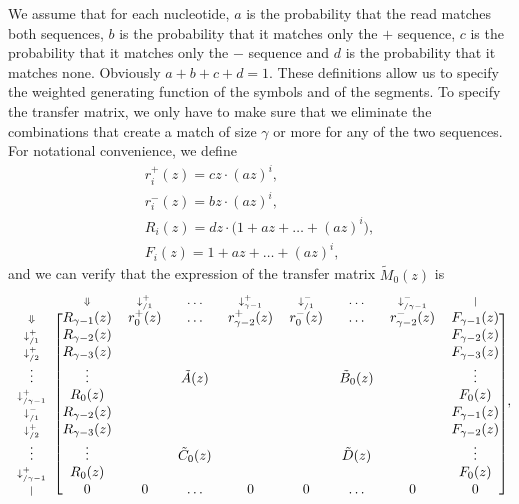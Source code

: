 \documentclass{article}
\begin{document}
We assume that for each nucleotide, $a$ is the probability that the read
matches both sequences, $b$ is the probability that it matches only the
$+$ sequence, $c$ is the probability that it matches only the $-$ sequence
and $d$ is the probability that it matches none. Obviously $a+b+c+d=1$.
These definitions allow us to specify the weighted generating function of
the symbols and of the segments. To specify the transfer matrix, we only
have to make sure that we eliminate the combinations that create a match
of size $\gamma$ or more for any of the two sequences. For notational
convenience, we define
\begin{equation*}
\begin{gathered}
r_i^+(z) = cz \cdot (az)^i, \\
r_i^-(z) = bz \cdot (az)^i, \\
R_i(z) = dz \cdot \big( 1 + az + \ldots + (az)^i \big), \\
F_i(z) = 1 + az + \ldots + (az)^i,
\end{gathered}
\end{equation*}
and we can verify that the expression of the transfer matrix
$\tilde{M}_0(z)$ is
\begin{equation*}
\begin{blockarray}{ccccccccc}
   & \scriptstyle{\Downarrow} & \scriptstyle{\downarrow_{/1}^+} & 
    \ldots & \scriptstyle{\downarrow_{\gamma-1}^+} &
    \scriptstyle{\downarrow_{/1}^-} & \ldots &
    \scriptstyle{\downarrow_{/\gamma-1}^-} & \scriptstyle{|} \\
\begin{block}{c[cccccccc]}
\scriptstyle{\Downarrow} & R_{\gamma-1}(z)  & r_0^+(z) & \ldots &
    r_{\gamma-2}^+(z) & r_0^-(z) & \ldots & r_{\gamma-2}^-(z) &
    F_{\gamma-1}(z) \\
\scriptstyle{\downarrow_{/1}^+} & R_{\gamma-2}(z) & & & & & & &
    F_{\gamma-2}(z) \\
\scriptstyle{\downarrow_{/2}^+} & R_{\gamma-3}(z) & & & & & & &
    F_{\gamma-3}(z) \\
\vdots & \vdots & & \tilde{A}(z) & & & \tilde{B}_0(z) & & \vdots \\
\scriptstyle{\downarrow_{/\gamma-1}^+} & R_0(z) & & & & & & & F_0(z) \\
\scriptstyle{\downarrow_{/1}^-} & R_{\gamma-2}(z) & & & & & & &
    F_{\gamma-1}(z) \\
\scriptstyle{\downarrow_{/2}^+} & R_{\gamma-3}(z) & & & & & & &
    F_{\gamma-2}(z) \\
\vdots & \vdots & & \tilde{C}_0(z) & & & \tilde{D}(z) & & \vdots \\
\scriptstyle{\downarrow_{/\gamma-1}^+} & R_0(z) & & & & & & & F_0(z) \\
\scriptstyle{|} & 0 & 0 & \ldots & 0 & 0 & \ldots & 0 & 0 \\
\end{block}
\end{blockarray},
\end{equation*}
\end{document}
